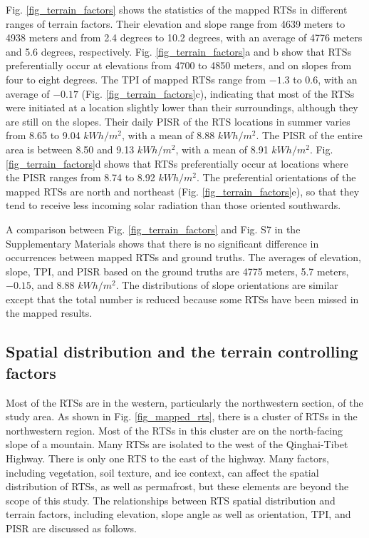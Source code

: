 \documentclass[authoryear,preprint,review,12pt]{elsarticle}
\begin{document}
Fig. \ref{fig_terrain_factors} shows the statistics of the mapped RTSs in different ranges of terrain factors. Their elevation and slope range from 4639 meters to 4938 meters and from 2.4 degrees to 10.2 degrees, with an average of 4776 meters and 5.6 degrees, respectively. Fig. \ref{fig_terrain_factors}a and b show that RTSs preferentially occur at elevations from 4700 to 4850 meters, and on slopes from four to eight degrees. The TPI of mapped RTSs range from $-1.3$ to 0.6, with an average of $-0.17$ (Fig. \ref{fig_terrain_factors}c), indicating that most of the RTSs were initiated at a location slightly lower than their surroundings, although they are still on the slopes. Their daily PISR of the RTS locations in summer varies from 8.65 to 9.04 $kWh/m^2$, with a mean of 8.88 $kWh/m^2$. The PISR of the entire area is between 8.50 and 9.13 $kWh/m^2$, with a mean of 8.91 $kWh/m^2$. Fig. \ref{fig_terrain_factors}d shows that RTSs preferentially occur at locations where the PISR ranges from 8.74 to 8.92 $kWh/m^2$.
The preferential orientations of the mapped RTSs are north and northeast (Fig. \ref{fig_terrain_factors}e), so that they tend to receive less incoming solar radiation than those oriented southwards. 

A comparison between Fig. \ref{fig_terrain_factors} and Fig. S7 in the Supplementary Materials shows that there is no significant difference in occurrences between mapped RTSs and ground truths. The averages of elevation, slope, TPI, and PISR based on the ground truths are 4775 meters, 5.7 meters, $-0.15$, and 8.88 $kWh/m^2$. The distributions of slope orientations are similar except that the total number is reduced because some RTSs have been missed in the mapped results. 

\subsection{Spatial distribution and the terrain controlling factors}
\label{subsec_rts_spatial}

Most of the RTSs are in the western, particularly the northwestern section, of the study area. As shown in Fig. \ref{fig_mapped_rts}, there is a cluster of RTSs in the northwestern region. Most of the RTSs in this cluster are on the north-facing slope of a mountain. Many RTSs are isolated to the west of the Qinghai-Tibet Highway. There is only one RTS to the east of the highway. Many factors, including vegetation, soil texture, and ice context, can affect the spatial distribution of RTSs, as well as permafrost, but these elements are beyond the scope of this study. The relationships between RTS spatial distribution and terrain factors, including elevation, slope angle as well as orientation, TPI, and PISR are discussed as follows.
\end{document}
